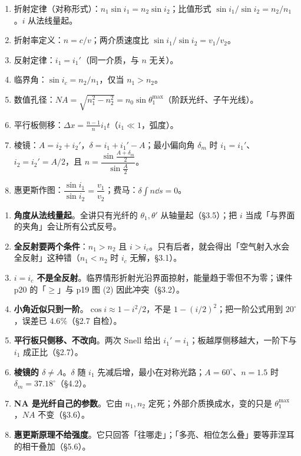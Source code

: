 \documentclass[11pt]{ctexart}
\begin{document}



\begin{enumerate}
  \item 折射定律（对称形式）：$n_1\sin i_1=n_2\sin i_2$；比值形式 $\sin i_1/\sin i_2=n_2/n_1$。$i$ 从法线量起。
  \item 折射率定义：$n=c/v$；两介质速度比 $\sin i_1/\sin i_2=v_1/v_2$。
  \item 反射定律：$i_1=i_1'$（同一介质，与 $n$ 无关）。
  \item 临界角：$\sin i_c=n_2/n_1$，仅当 $n_1>n_2$。
  \item 数值孔径：$NA=\sqrt{n_1^2-n_2^2}=n_0\sin\theta_1^{\max}$（阶跃光纤、子午光线）。
  \item 平行板侧移：$\Delta x=\frac{n-1}{n}i_1t$（$i_1\ll1$，弧度）。
  \item 棱镜：$A=i_2+i_2'$，$\delta=i_1+i_1'-A$；最小偏向角 $\delta_m$ 时 $i_1=i_1'$、$i_2=i_2'=A/2$，且 $n=\dfrac{\sin\frac{A+\delta_m}{2}}{\sin\frac{A}{2}}$。
  \item 惠更斯作图：$\dfrac{\sin i_1}{\sin i_2}=\dfrac{v_1}{v_2}$；费马：$\delta\!\int n\dd s=0$。
\end{enumerate}

\begin{enumerate}
  \item \textbf{角度从法线量起}。全讲只有光纤的 $\theta_1,\theta'$ 从轴量起（§3.5）；把 $i$ 当成「与界面的夹角」会让所有公式反号。
  \item \textbf{全反射要两个条件}：$n_1>n_2$ 且 $i>i_c$。只有后者，就会得出「空气射入水会全反射」这种错（\(n_1<n_2\) 时 $i_c$ 无解，§3.1）。
  \item \textbf{$i=i_c$ 不是全反射}。临界情形折射光沿界面掠射，能量趋于零但不为零；课件 p20 的「$\ge$」与 p19 图 (2) 因此冲突（§3.2）。
  \item \textbf{小角近似只到一阶}。$\cos i\approx1-i^2/2$，不是 $1-(i/2)^2$；把一阶公式用到 $20^\circ$，误差已 $4.6\%$（§2.7 自检）。
  \item \textbf{平行板只侧移、不改向}。两次 Snell 给出 $i_1'=i_1$；板越厚侧移越大，一阶下与 $i_1$ 成正比（§2.7）。
  \item \textbf{棱镜的 $\delta\ne A$}。$\delta$ 随 $i_1$ 先减后增，最小在对称光路；$A=60^\circ$、$n=1.5$ 时 $\delta_m=37.18^\circ$（§4.2）。
  \item \textbf{NA 是光纤自己的参数}。它由 $n_1,n_2$ 定死；外部介质换成水，变的只是 $\theta_1^{\max}$，$NA$ 不变（§3.6）。
  \item \textbf{惠更斯原理不给强度}。它只回答「往哪走」；「多亮、相位怎么叠」要等菲涅耳的相干叠加（§5.6）。
\end{enumerate}
\end{document}
